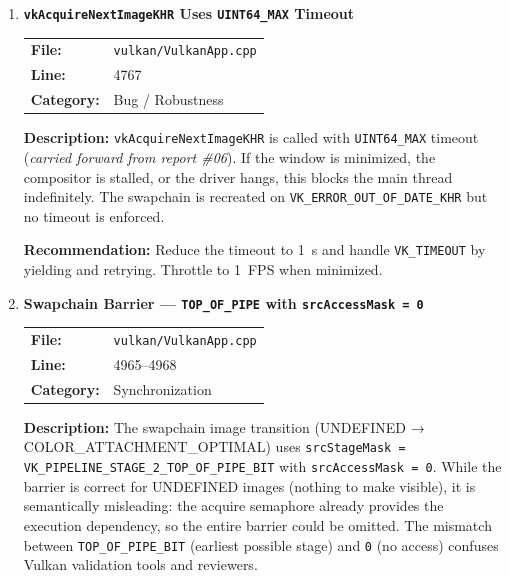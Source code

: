 \documentclass[a4paper,12pt]{article}
\newcommand{\severitybox}[2]{%
  \colorbox{#1}{\makebox[2.5cm][c]{\textcolor{white}{\textbf{#2}}}}%
}
\begin{document}
\begin{enumerate}[leftmargin=*]

\item[\textbf{[B4]}] \textbf{\texttt{vkAcquireNextImageKHR} Uses \texttt{UINT64\_MAX} Timeout}
  \hfill \severitybox{mediumcolor}{MEDIUM}

  \begin{tabular}{ll}
    \textbf{File:} & \texttt{vulkan/VulkanApp.cpp} \\
    \textbf{Line:} & 4767 \\
    \textbf{Category:} & Bug / Robustness \\
  \end{tabular}

  \textbf{Description:}
  \texttt{vkAcquireNextImageKHR} is called with \texttt{UINT64\_MAX} timeout
  (\textit{carried forward from report \#06}). If the window is minimized,
  the compositor is stalled, or the driver hangs, this blocks the main thread
  indefinitely. The swapchain is recreated on \texttt{VK\_ERROR\_OUT\_OF\_DATE\_KHR}
  but no timeout is enforced.

  \textbf{Recommendation:}
  Reduce the timeout to 1~s and handle \texttt{VK\_TIMEOUT} by yielding and
  retrying. Throttle to 1~FPS when minimized.

\item[\textbf{[S4]}] \textbf{Swapchain Barrier — \texttt{TOP\_OF\_PIPE} with \texttt{srcAccessMask = 0}}
  \hfill \severitybox{mediumcolor}{MEDIUM}

  \begin{tabular}{ll}
    \textbf{File:} & \texttt{vulkan/VulkanApp.cpp} \\
    \textbf{Line:} & 4965--4968 \\
    \textbf{Category:} & Synchronization \\
  \end{tabular}

  \textbf{Description:}
  The swapchain image transition (UNDEFINED → COLOR\_ATTACHMENT\_OPTIMAL) uses
  \texttt{srcStageMask = VK\_PIPELINE\_STAGE\_2\_TOP\_OF\_PIPE\_BIT} with
  \texttt{srcAccessMask = 0}. While the barrier is correct for UNDEFINED
  images (nothing to make visible), it is semantically misleading: the
  acquire semaphore already provides the execution dependency, so the entire
  barrier could be omitted. The mismatch between
  \texttt{TOP\_OF\_PIPE\_BIT} (earliest possible stage) and \texttt{0}
  (no access) confuses Vulkan validation tools and reviewers.


\end{enumerate}
\end{document}
